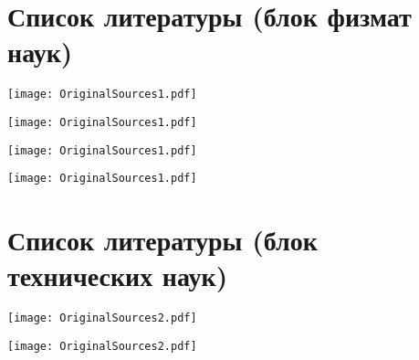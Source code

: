 \documentclass[main.tex]{subfiles}
\begin{document}
\setcounter{secnumdepth}{0}

\section{Список литературы (блок физмат наук)}

\vspace{-10mm}

{\parindent-20pt\texttt{[image: OriginalSources1.pdf]}}\newpage

{\parindent-30pt\texttt{[image: OriginalSources1.pdf]}}\newpage

{\parindent-30pt\texttt{[image: OriginalSources1.pdf]}}\newpage

{\parindent-30pt\texttt{[image: OriginalSources1.pdf]}}


\section{Список литературы (блок технических наук)}

\vspace{-10mm}

{\parindent-20pt\texttt{[image: OriginalSources2.pdf]}}\newpage

{\parindent-30pt\texttt{[image: OriginalSources2.pdf]}}\newpage
\end{document}
